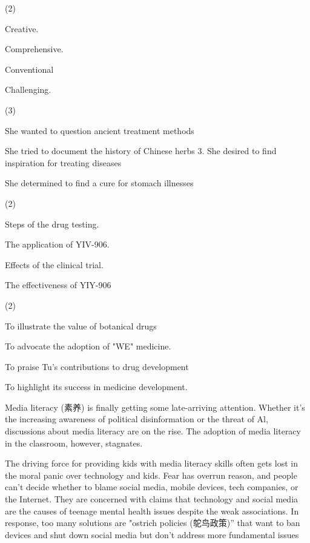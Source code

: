 \documentclass{英语试卷}
\begin{document}
\begin{choices}(2)
  \item Creative.
  \item Comprehensive.
  \item Conventional
  \item Challenging.
\end{choices}
\begin{choices}(3)
  \item She wanted to question ancient treatment methods
  \item She tried to document the history of Chinese herbs 3. She desired to find inspiration for treating diseases
  \item She determined to find a cure for stomach illnesses
\end{choices}
\begin{choices}(2)
  \item Steps of the drug testing.
  \item The application of YIV-906.
  \item Effects of the clinical trial.
  \item The effectiveness of YIY-906
\end{choices}
\begin{choices}(2)
  \item To illustrate the value of botanical drugs
  \item To advocate the adoption of "WE" medicine.
  \item To praise Tu's contributions to drug development
  \item To highlight its success in medicine development.
\end{choices}
\par Media literacy (素养) is finally getting some late-arriving attention. Whether it's the increasing awareness of political disinformation or the threat of Al, discussions about media literacy are on the rise. The adoption of media literacy in the classroom, however, stagnates.\par
\par The driving force for providing kids with media literacy skills often gets lost in the moral panic over technology and kids. Fear has overrun reason, and people can't decide whether to blame social media, mobile devices, tech companies, or the Internet. They are concerned with claims that technology and social media are the causes of teenage mental health issues despite the weak associations. In response, too many solutions are "ostrich policies (鸵鸟政策)” that want to ban devices and shut down social media but don't address more fundamental issues\par
\end{document}
